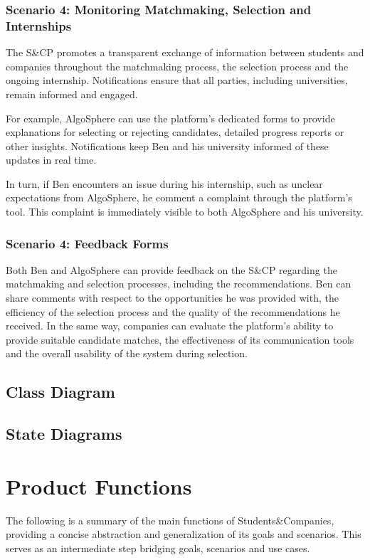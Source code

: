 \subsubsection{Scenario 4: Monitoring Matchmaking, Selection and Internships}
The S\&CP promotes a transparent exchange of information between students and companies throughout the matchmaking process, the selection process and the ongoing internship.
Notifications ensure that all parties, including universities, remain informed and engaged.

For example, AlgoSphere can use the platform's dedicated forms to provide explanations for selecting or rejecting candidates, detailed progress reports or other insights.
Notifications keep Ben and his university informed of these updates in real time.

In turn, if Ben encounters an issue during his internship, such as unclear expectations from AlgoSphere, he comment a complaint through the platform's tool.
This complaint is immediately visible to both AlgoSphere and his university.

\subsubsection{Scenario 4: Feedback Forms}
Both Ben and AlgoSphere can provide feedback on the S\&CP regarding the matchmaking and selection processes, including the recommendations.
Ben can share comments with respect to the opportunities he was provided with, the efficiency of the selection process and the quality of the recommendations he received.
In the same way, companies can evaluate the platform's ability to provide suitable candidate matches, the effectiveness of its communication tools and the overall usability of the system during selection.

\subsection{Class Diagram}
\subsection{State Diagrams}
\section{Product Functions}
The following is a summary of the main functions of Students\&Companies, providing a concise abstraction and generalization of its goals and scenarios.
This serves as an intermediate step bridging goals, scenarios and use cases.

